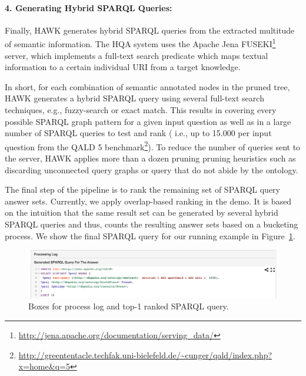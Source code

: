 \documentclass{llncs}
\begin{document}
\paragraph{\textbf{4. Generating Hybrid SPARQL Queries}:}
Finally, HAWK generates hybrid SPARQL queries from the extracted multitude of semantic information.
The HQA system uses the Apache Jena FUSEKI\footnote{\url{http://jena.apache.org/documentation/serving_data/}} server, which implements a full-text search predicate which maps textual information to a certain individual URI from a target knowledge.

In short, for each combination of semantic annotated nodes in the pruned tree, HAWK generates a hybrid SPARQL query using several full-text search techniques, e.g., fuzzy-search or exact match.
This results in covering every possible SPARQL graph pattern for a given input question as well as in a large number of SPARQL queries to test and rank ( i.e., up to 15.000 per input question from the QALD 5 benchmark\footnote{\url{http://greententacle.techfak.uni-bielefeld.de/~cunger/qald/index.php?x=home&q=5}}).
To reduce the number of queries sent to the server, HAWK applies more than a dozen pruning pruning heuristics such as discarding unconnected query graphs or query that do not abide by the ontology.

The final step of the pipeline is to rank the remaining set of SPARQL query answer sets. 
Currently, we apply overlap-based ranking in the demo.
It is based on the intuition that the same result set can be generated by several hybrid SPARQL queries and thus, counts the resulting answer sets based on a bucketing process.
We show the final SPARQL query for our running example in Figure~\ref{fig:4_final_SPARQL}.

\begin{figure}[htb!]
\centering
\includegraphics[width=\linewidth]{4_final_sparql}
\caption{Boxes for process log and top-1 ranked SPARQL query.}
\label{fig:4_final_SPARQL}
\end{figure}


\end{document}

